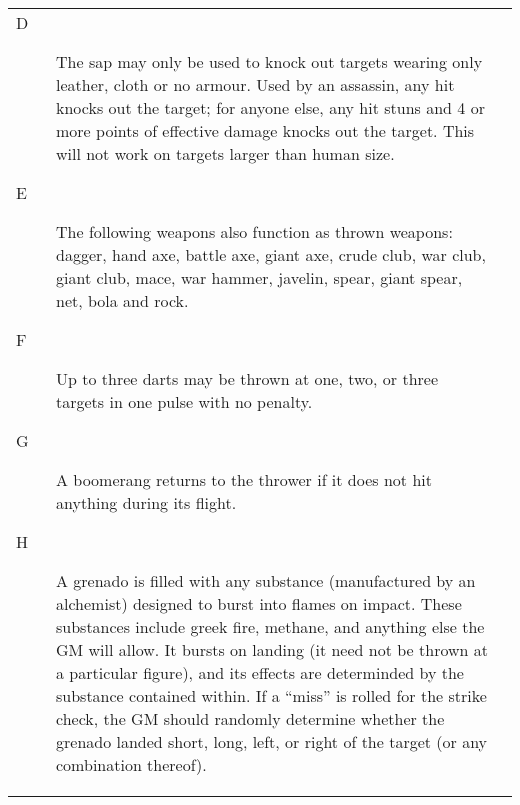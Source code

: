 \begin{tabular}[t]{l|r}
\begin{minipage}[t]{2.1in}
{\begin{description}
\item[D] The sap may only be used to knock out targets wearing only
leather, cloth or no armour.  Used by an assassin, any hit knocks out
the target; for anyone else, any hit stuns and 4 or more points of
effective damage knocks out the target.  This will not work on targets
larger than human size.

\item[E] The following weapons also function as thrown weapons:
dagger, hand axe, battle axe, giant axe, crude club, war club, giant
club, mace, war hammer, javelin, spear, giant spear, net, bola and
rock.

\item[F] Up to three darts may be thrown at one, two, or three targets
in one pulse with no penalty.

\item[G] A boomerang returns to the thrower if it does not hit anything
during its flight.

\item[H] A grenado is filled with any substance (manufactured by an
alchemist) designed to burst into flames on impact.  These substances
include greek fire, methane, and anything else the GM will allow.  It
bursts on landing (it need not be thrown at a particular figure), and
its effects are determinded by the substance contained within.  If a
``miss'' is rolled for the strike check, the GM should randomly
determine whether the grenado landed short, long, left, or right of
the target (or any combination thereof).

\end{description}}
\end{minipage}

&


\end{tabular}
